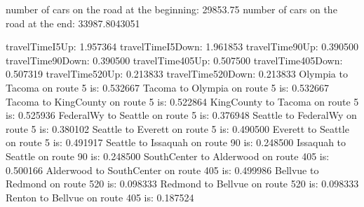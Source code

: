 number of cars on the road at the beginning:
29853.75
number of cars on the road at the end:
33987.8043051

travelTimeI5Up: 1.957364
travelTimeI5Down: 1.961853
travelTime90Up: 0.390500
travelTime90Down: 0.390500
travelTime405Up: 0.507500
travelTime405Down: 0.507319
travelTime520Up: 0.213833
travelTime520Down: 0.213833
Olympia to Tacoma on route 5 is: 0.532667
Tacoma to Olympia on route 5 is: 0.532667
Tacoma to KingCounty on route 5 is: 0.522864
KingCounty to Tacoma on route 5 is: 0.525936
FederalWy to Seattle on route 5 is: 0.376948
Seattle to FederalWy on route 5 is: 0.380102
Seattle to Everett on route 5 is: 0.490500
Everett to Seattle on route 5 is: 0.491917
Seattle to Issaquah on route 90 is: 0.248500
Issaquah to Seattle on route 90 is: 0.248500
SouthCenter to Alderwood on route 405 is: 0.500166
Alderwood to SouthCenter on route 405 is: 0.499986
Bellvue to Redmond on route 520 is: 0.098333
Redmond to Bellvue on route 520 is: 0.098333
Renton to Bellvue on route 405 is: 0.187524
